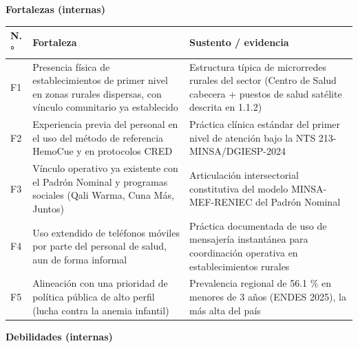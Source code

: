 \documentclass[11pt,a4paper]{article}
\begin{document}
\textbf{Fortalezas (internas)}

{\small
\begin{longtable}[]{@{}
  >{\raggedright\arraybackslash}p{}
  >{\raggedright\arraybackslash}p{}
  >{\raggedright\arraybackslash}p{}@{}}
\toprule\noalign{}
\begin{minipage}[b]{\linewidth}\raggedright
N.°
\end{minipage} & \begin{minipage}[b]{\linewidth}\raggedright
Fortaleza
\end{minipage} & \begin{minipage}[b]{\linewidth}\raggedright
Sustento / evidencia
\end{minipage} \\
\midrule\noalign{}
\endhead
\bottomrule\noalign{}
\endlastfoot
F1 & Presencia física de establecimientos de primer nivel en zonas rurales dispersas, con vínculo comunitario ya establecido & Estructura típica de microrredes rurales del sector (Centro de Salud cabecera + puestos de salud satélite descrita en 1.1.2) \\
F2 & Experiencia previa del personal en el uso del método de referencia HemoCue y en protocolos CRED & Práctica clínica estándar del primer nivel de atención bajo la NTS 213-MINSA/DGIESP-2024 \\
F3 & Vínculo operativo ya existente con el Padrón Nominal y programas sociales (Qali Warma, Cuna Más, Juntos) & Articulación intersectorial constitutiva del modelo MINSA-MEF-RENIEC del Padrón Nominal \\
F4 & Uso extendido de teléfonos móviles por parte del personal de salud, aun de forma informal & Práctica documentada de uso de mensajería instantánea para coordinación operativa en establecimientos rurales \\
F5 & Alineación con una prioridad de política pública de alto perfil (lucha contra la anemia infantil) & Prevalencia regional de 56.1 \% en menores de 3 años (ENDES 2025), la más alta del país \\
\end{longtable}
}

\textbf{Debilidades (internas)}
\end{document}
